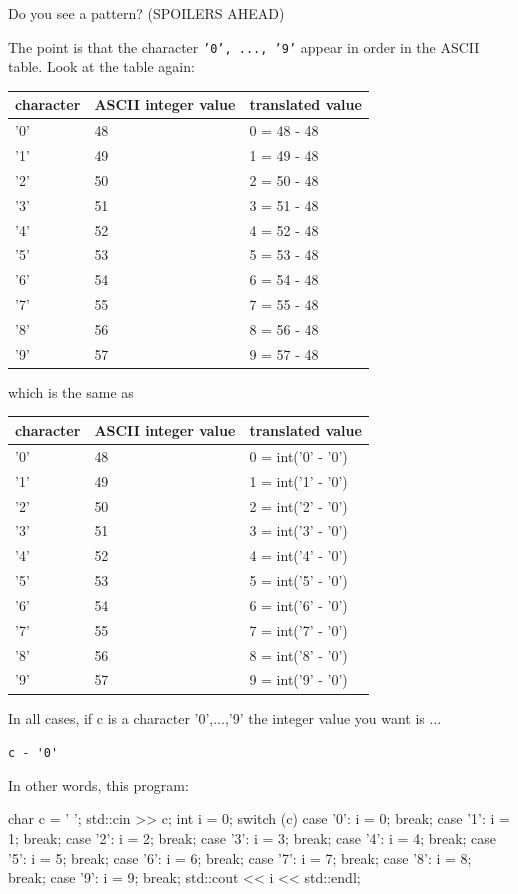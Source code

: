 Do you see a pattern? (SPOILERS AHEAD)

The point is that the character \texttt{'0', ..., '9'} appear in order in the ASCII table. Look at the table again:

\begin{tabular}{lll}
character & ASCII integer value & translated value \\
\hline
'0' & 48 & 0 = 48 - 48 \\
'1' & 49 & 1 = 49 - 48 \\
'2' & 50 & 2 = 50 - 48 \\
'3' & 51 & 3 = 51 - 48 \\
'4' & 52 & 4 = 52 - 48 \\
'5' & 53 & 5 = 53 - 48 \\
'6' & 54 & 6 = 54 - 48 \\
'7' & 55 & 7 = 55 - 48 \\
'8' & 56 & 8 = 56 - 48 \\
'9' & 57 & 9 = 57 - 48 \\
\end{tabular}

which is the same as

\begin{tabular}{lll}
character & ASCII integer value & translated value \\
\hline
'0' & 48 & 0 = int('0' - '0') \\
'1' & 49 & 1 = int('1' - '0') \\
'2' & 50 & 2 = int('2' - '0') \\
'3' & 51 & 3 = int('3' - '0') \\
'4' & 52 & 4 = int('4' - '0') \\
'5' & 53 & 5 = int('5' - '0') \\
'6' & 54 & 6 = int('6' - '0') \\
'7' & 55 & 7 = int('7' - '0') \\
'8' & 56 & 8 = int('8' - '0') \\
'9' & 57 & 9 = int('9' - '0') \\
\end{tabular}

In all cases, if c is a character '0',...,'9' the integer value you want is ...

\begin{center}
\verb!c - '0'!
\end{center}

 In other words, this program:

\begin{consolethree}[escapeinside=||]
char c = ' ';
std::cin >> c;
int i = 0;
switch (c)
{
    case '0': i = 0; break;
    case '1': i = 1; break;
    case '2': i = 2; break;
    case '3': i = 3; break;
    case '4': i = 4; break;
    case '5': i = 5; break;
    case '6': i = 6; break;
    case '7': i = 7; break;
    case '8': i = 8; break;
    case '9': i = 9; break;
}
std::cout << i << std::endl;
\end{consolethree}

